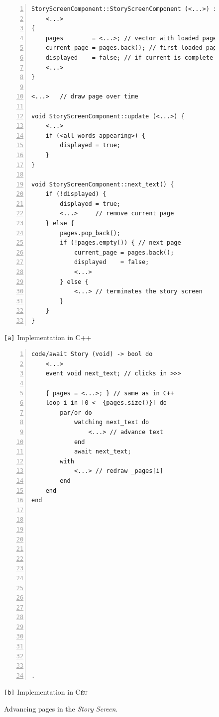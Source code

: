 \documentclass{vgtc}                          %
\newcommand{\CEU}{\textsc{C\'{e}u}\xspace}
\newcommand{\code}[1] {{\small{\texttt{#1}}}}
\newcommand{\ax}{\code{[a]}\xspace}
\newcommand{\bx}{\code{[b]}\xspace}
\begin{document}
\begin{figure}[t]
\begin{minipage}[t]{0.55\linewidth}
\begin{lstlisting}[numbers=left,xleftmargin=3em]
StoryScreenComponent::StoryScreenComponent (<...>) :
    <...>
{
    pages        = <...>; // vector with loaded pages
    current_page = pages.back(); // first loaded page
    displayed    = false; // if current is complete
    <...>
}

<...>   // draw page over time

void StoryScreenComponent::update (<...>) {
    <...>
    if (<all-words-appearing>) {
        displayed = true;
    }
}

void StoryScreenComponent::next_text() {
    if (!displayed) {
        displayed = true;
        <...>     // remove current page
    } else {
        pages.pop_back();
        if (!pages.empty()) { // next page
            current_page = pages.back();
            displayed    = false;
            <...>
        } else {
            <...> // terminates the story screen
        }
    }
}
\end{lstlisting}
\centering\small{\ax Implementation in C++}
\end{minipage}
%
\begin{minipage}[t]{0.45\linewidth}
\begin{lstlisting}[numbers=left,xleftmargin=3em]
code/await Story (void) -> bool do
    <...>
    event void next_text; // clicks in >>>

    { pages = <...>; } // same as in C++
    loop i in [0 <- {pages.size()}[ do
        par/or do
            watching next_text do
                <...> // advance text
            end
            await next_text;
        with
            <...> // redraw _pages[i]
        end
    end
end

















.
\end{lstlisting}
\centering\small{\bx Implementation in \CEU}
\end{minipage}
\caption{ Advancing pages in the \emph{Story Screen}.
\label{lst.story}
}
\end{figure}
\end{document}

